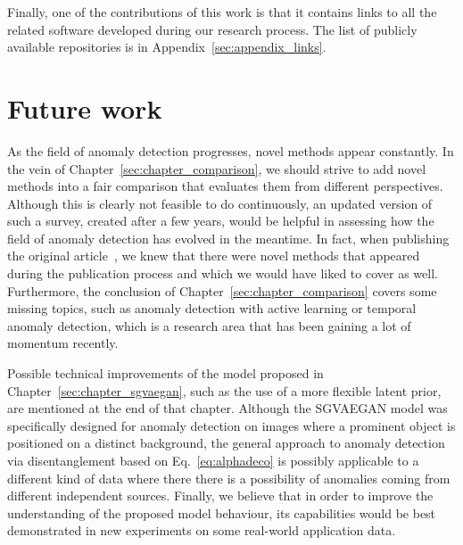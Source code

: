 Finally, one of the contributions of this work is that it contains links to all the related software developed during our research process. The list of publicly available repositories is in Appendix~\ref{sec:appendix_links}.

\section{Future work}
As the field of anomaly detection progresses, novel methods appear constantly. In the vein of Chapter~\ref{sec:chapter_comparison}, we should strive to add novel methods into a fair comparison that evaluates them from different perspectives. Although this is clearly not feasible to do continuously, an updated version of such a survey, created after a few years, would be helpful in assessing how the field of anomaly detection has evolved in the meantime. In fact, when publishing the original article~\cite{vskvara2021comparison}, we knew that there were novel methods that appeared during the publication process and which we would have liked to cover as well. Furthermore, the conclusion of Chapter~\ref{sec:chapter_comparison} covers some missing topics, such as anomaly detection with active learning or temporal anomaly detection, which is a research area that has been gaining a lot of momentum recently.

Possible technical improvements of the model proposed in Chapter~\ref{sec:chapter_sgvaegan}, such as the use of a more flexible latent prior, are mentioned at the end of that chapter. Although the SGVAEGAN model was specifically designed for anomaly detection on images where a prominent object is positioned on a distinct background, the general approach to anomaly detection via disentanglement based on Eq.~\eqref{eq:alphadeco} is possibly applicable to a different kind of data where there there is a possibility of anomalies coming from different independent sources. Finally, we believe that in order to improve the understanding of the proposed model behaviour, its capabilities would be best demonstrated in new experiments on some real-world application data.